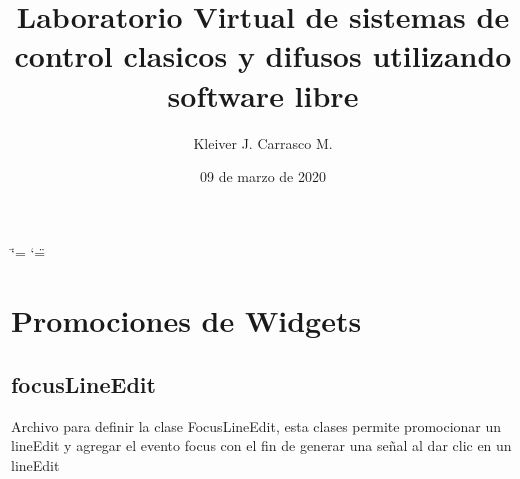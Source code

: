 \documentclass[letterpaper,10pt,spanish]{sphinxmanual}
\title{Laboratorio Virtual de sistemas de control clasicos y difusos utilizando software libre}
\date{09 de marzo de 2020}
\author{Kleiver J. Carrasco M.}
\begin{document}
\ifdefined\shorthandoff
  \ifnum\catcode`\=\string=\active\shorthandoff{=}\fi
  \ifnum\catcode`\"=\active{}\fi
\fi

\pagestyle{empty}
\sphinxmaketitle
\pagestyle{plain}
\sphinxtableofcontents
\pagestyle{normal}
\label{\detokenize{index::doc}}



\chapter{Promociones de Widgets}
\label{\detokenize{codigos/Promociones:promociones-de-widgets}}\label{\detokenize{codigos/Promociones::doc}}

\section{focusLineEdit}
\label{\detokenize{codigos/Promociones:module-focusLineEdit}}\label{\detokenize{codigos/Promociones:focuslineedit}}
Archivo para definir la clase FocusLineEdit, esta clases permite promocionar un lineEdit y agregar el evento focus con el fin de generar una señal al dar clic en un lineEdit
\end{document}
